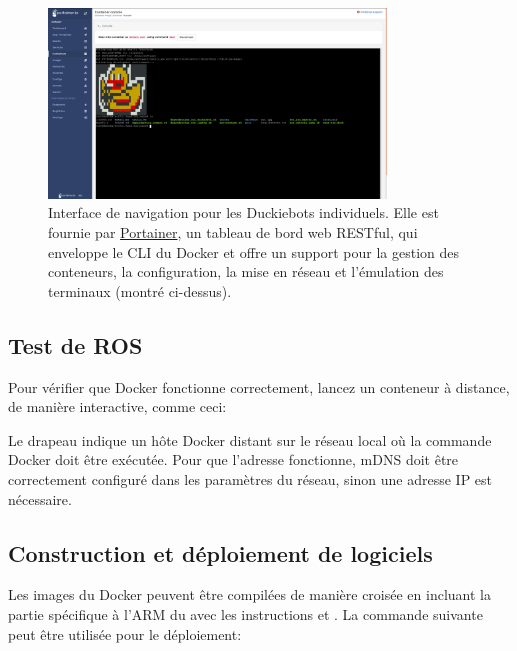 \begin{figure}
\includegraphics[width=0.80\textwidth]{../figures/portainer_screenshot.png}
\caption{Interface de navigation pour les Duckiebots individuels. Elle est fournie par \href{https://www.portainer.io/}{Portainer}, un tableau de bord web RESTful, qui enveloppe le CLI du Docker et offre un support pour la gestion des conteneurs, la configuration, la mise en réseau et l'émulation des terminaux (montré ci-dessus).}
\label{fig:portainer_ui}
\end{figure}

\subsection{Test de ROS}

\noindent Pour vérifier que Docker fonctionne correctement, lancez un conteneur à distance, de manière interactive, comme ceci:

%
Le drapeau  indique un hôte Docker distant sur le réseau local où la commande Docker doit être exécutée. Pour que l'adresse  fonctionne, mDNS doit être correctement configuré dans les paramètres du réseau, sinon une adresse IP est nécessaire.

\subsection{Construction et déploiement de logiciels}

Les images du Docker peuvent être compilées de manière croisée en incluant la partie spécifique à l'ARM du  avec les instructions  et . La commande suivante peut être utilisée pour le déploiement:

